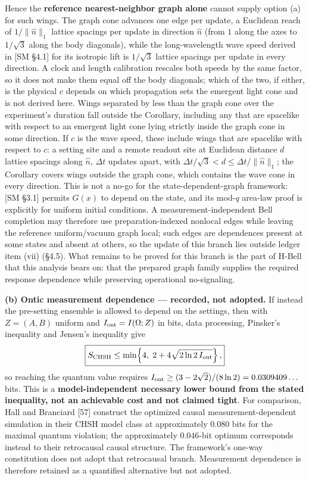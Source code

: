 \documentclass[
]{article}
\begin{document}
Hence the \textbf{reference nearest-neighbor graph alone} cannot supply
option (a) for such wings. The graph cone advances one edge per update,
a Euclidean reach of \(1/\lVert\hat n\rVert_1\) lattice spacings per
update in direction \(\hat n\) (from \(1\) along the axes to
\(1/\sqrt3\) along the body diagonals), while the long-wavelength wave
speed derived in {[}SM §4.1{]} for its isotropic lift is \(1/\sqrt3\)
lattice spacings per update in every direction. A clock and length
calibration rescales both speeds by the same factor, so it does not make
them equal off the body diagonals; which of the two, if either, is the
physical \(c\) depends on which propagation sets the emergent light cone
and is not derived here. Wings separated by less than the graph cone
over the experiment's duration fall outside the Corollary, including any
that are spacelike with respect to an emergent light cone lying strictly
inside the graph cone in some direction. If \(c\) is the wave speed,
these include wings that are spacelike with respect to \(c\): a setting
site and a remote readout site at Euclidean distance \(d\) lattice
spacings along \(\hat n\), \(\Delta t\) updates apart, with
\(\Delta t/\sqrt3 < d \le \Delta t/\lVert\hat n\rVert_1\); the Corollary
covers wings outside the graph cone, which contains the wave cone in
every direction. This is not a no-go for the state-dependent-graph
framework: {[}SM §3.1{]} permits \(G(x)\) to depend on the state, and
its mod-\(q\) area-law proof is explicitly for uniform initial
conditions. A measurement-independent Bell completion may therefore use
preparation-indexed nonlocal edges while leaving the reference
uniform/vacuum graph local; such edges are dependences present at some
states and absent at others, so the update of this branch lies outside
ledger item (vii) (§4.5). What remains to be proved for this branch is
the part of H-Bell that this analysis bears on: that the prepared graph
family supplies the required response dependence while preserving
operational no-signaling.

\textbf{(b) Ontic measurement dependence --- recorded, not adopted.} If
instead the pre-setting ensemble is allowed to depend on the settings,
then with \(Z=(A,B)\) uniform and \(I_{\rm ont}=I(\Omega;Z)\) in bits,
data processing, Pinsker's inequality and Jensen's inequality give \[
\boxed{
S_{\rm CHSH}\le\min\!\left\{4,\;2+4\sqrt{2\ln 2\,I_{\rm ont}}\right\},
}
\] so reaching the quantum value requires
\(I_{\rm ont}\ge(3-2\sqrt2)/(8\ln 2)=0.0309409\ldots\) bits. This is a
\textbf{model-independent necessary lower bound from the stated
inequality, not an achievable cost and not claimed tight}. For
comparison, Hall and Branciard {[}57{]} construct the optimized causal
measurement-dependent simulation in their CHSH model class at
approximately \(0.080\) bits for the maximal quantum violation; the
approximately \(0.046\)-bit optimum corresponds instead to their
retrocausal causal structure. The framework's one-way constitution does
not adopt that retrocausal branch. Measurement dependence is therefore
retained as a quantified alternative but not adopted.
\end{document}
